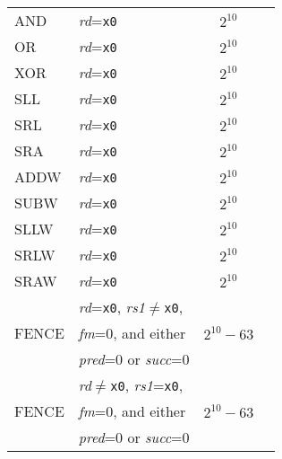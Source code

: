 \begin{table}[hbt]
\begin{tabular}{|l|l|c|l|}
  AND                   & {\em rd}={\tt x0}                           & $2^{10}$                    & \\ \cline{1-3}
  OR                    & {\em rd}={\tt x0}                           & $2^{10}$                    & \\ \cline{1-3}
  XOR                   & {\em rd}={\tt x0}                           & $2^{10}$                    & \\ \cline{1-3}
  SLL                   & {\em rd}={\tt x0}                           & $2^{10}$                    & \\ \cline{1-3}
  SRL                   & {\em rd}={\tt x0}                           & $2^{10}$                    & \\ \cline{1-3}
  SRA                   & {\em rd}={\tt x0}                           & $2^{10}$                    & \\ \cline{1-3}
  ADDW                  & {\em rd}={\tt x0}                           & $2^{10}$                    & \\ \cline{1-3}
  SUBW                  & {\em rd}={\tt x0}                           & $2^{10}$                    & \\ \cline{1-3}
  SLLW                  & {\em rd}={\tt x0}                           & $2^{10}$                    & \\ \cline{1-3}
  SRLW                  & {\em rd}={\tt x0}                           & $2^{10}$                    & \\ \cline{1-3}
  SRAW                  & {\em rd}={\tt x0}                           & $2^{10}$                    & \\ \cline{1-3}
  \multirow{3}{*}{FENCE}& {\em rd}={\tt x0}, {\em rs1}$\neq${\tt x0}, & \multirow{3}{*}{$2^{10}-63$}& \\
                        & {\em fm}=0, and either                      &                             & \\
                        & {\em pred}=0 or {\em succ}=0                &                             & \\ \cline{1-3}
  \multirow{3}{*}{FENCE}& {\em rd}$\neq${\tt x0}, {\em rs1}={\tt x0}, & \multirow{3}{*}{$2^{10}-63$}& \\
                        & {\em fm}=0, and either                      &                             & \\
                        & {\em pred}=0 or {\em succ}=0                &                             & \\ \cline{1-3}

\end{tabular}
\end{table}
